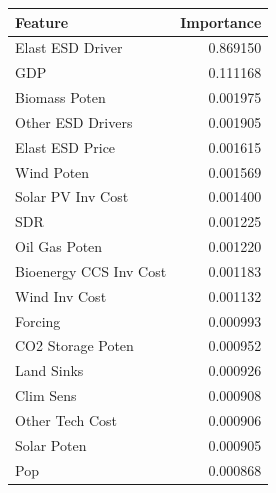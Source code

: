 \begin{tabular}{lr}
\toprule
Feature & Importance \\
\midrule
Elast ESD Driver & 0.869150 \\
GDP & 0.111168 \\
Biomass Poten & 0.001975 \\
Other ESD Drivers & 0.001905 \\
Elast ESD Price & 0.001615 \\
Wind Poten & 0.001569 \\
Solar PV Inv Cost & 0.001400 \\
SDR & 0.001225 \\
Oil Gas Poten & 0.001220 \\
Bioenergy CCS Inv Cost & 0.001183 \\
Wind Inv Cost & 0.001132 \\
Forcing & 0.000993 \\
CO2 Storage Poten & 0.000952 \\
Land Sinks & 0.000926 \\
Clim Sens & 0.000908 \\
Other Tech Cost & 0.000906 \\
Solar Poten & 0.000905 \\
Pop & 0.000868 \\
\bottomrule
\end{tabular}
